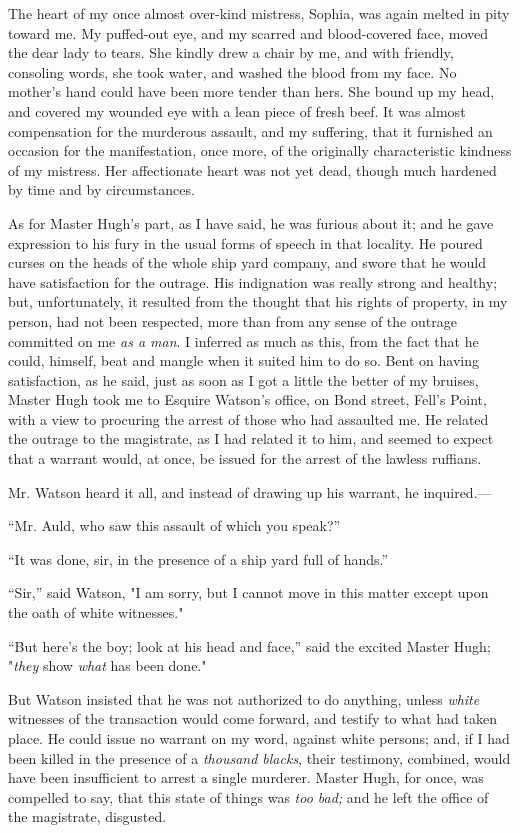 The heart of my once almost over-kind mistress, Sophia, was again melted
in pity toward me. My puffed-out eye, and my scarred and blood-covered
face, moved the dear lady to tears. She kindly drew a chair by me, and
with friendly, consoling words, she took water, and washed the blood
from my face. No mother's hand could have been more tender than hers.
She bound up my head, and covered my wounded eye with a lean piece of
fresh beef. It was almost compensation for the murderous assault, and
{}my suffering, that it furnished an occasion for the manifestation,
once more, of the originally characteristic kindness of my mistress. Her
affectionate heart was not yet dead, though much hardened by time and by
circumstances.

As for Master Hugh's part, as I have said, he was furious about it; and
he gave expression to his fury in the usual forms of speech in that
locality. He poured curses on the heads of the whole ship yard company,
and swore that he would have satisfaction for the outrage. His
indignation was really strong and healthy; but, unfortunately, it
resulted from the thought that his rights of property, in my person, had
not been respected, more than from any sense of the outrage committed on
me \emph{as a man}. I inferred as much as this, from the fact that he
could, himself, beat and mangle when it suited him to do so. Bent on
having satisfaction, as he said, just as soon as I got a little the
better of my bruises, Master Hugh took me to Esquire Watson's office, on
Bond street, Fell's Point, with a view to procuring the arrest of those
who had assaulted me. He related the outrage to the magistrate, as I had
related it to him, and seemed to expect that a warrant would, at once,
be issued for the arrest of the lawless ruffians.

Mr. Watson heard it all, and instead of drawing up his warrant, he
inquired.---

``Mr. Auld, who saw this assault of which you speak?''

``It was done, sir, in the presence of a ship yard full of hands.''

``Sir,'' said Watson, "I am sorry, but I cannot move {}in this matter
except upon the oath of white witnesses."

``But here's the boy; look at his head and face,'' said the excited
Master Hugh; "\emph{they} show \emph{what} has been done."

But Watson insisted that he was not authorized to do anything, unless
\emph{white} witnesses of the transaction would come forward, and
testify to what had taken place. He could issue no warrant on my word,
against white persons; and, if I had been killed in the presence of a
\emph{thousand blacks}, their testimony, combined, would have been
insufficient to arrest a single murderer. Master Hugh, for once, was
compelled to say, that this state of things was \emph{too bad;} and he
left the office of the magistrate, disgusted.

